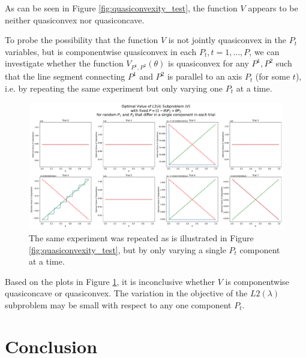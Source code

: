 \documentclass{article}
\begin{document}
As can be seen in Figure \ref{fig:quasiconvexity_test}, the function $V$ appears to be neither quasiconvex nor quasiconcave.

To probe the possibility that the function $V$ is not jointly quasiconvex in the $P_t$ variables, but is componentwise quasiconvex in each $P_t,t=1,\ldots,P$, we can investigate whether the function $V_{P^1,P^2}(\theta)$ is quasiconvex for any $P^1,P^2$ such that the line segment connecting $P^1$ and $P^2$ is parallel to an axis $P_t$ (for some $t$), i.e. by repeating the same experiment but only varying one $P_t$ at a time.
\begin{figure}[H]
    \center
    \includegraphics[width=\linewidth]{figures/L2_quasiconvexity_test_componentwise.pdf}
    \caption{The same experiment was repeated as is illustrated in Figure \ref{fig:quasiconvexity_test}, but by only varying a single $P_t$ component at a time.}\label{fig:quasiconvexity_test_componentwise}
\end{figure}

Based on the plots in Figure \ref{fig:quasiconvexity_test_componentwise}, it is inconclusive whether $V$ is componentwise quasiconcave or quasiconvex. The variation in the objective of the $L2(\lambda)$ subproblem may be small with respect to any one component $P_t$.



\section{Conclusion}



\newpage
\newpage


\nocite{*}
\end{document}
